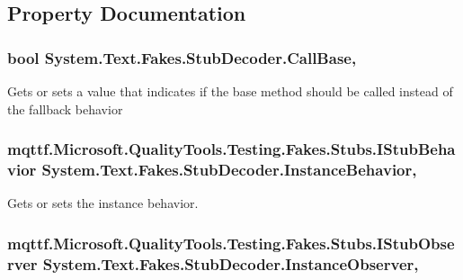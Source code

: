 \subsection{Property Documentation}
\hypertarget{class_system_1_1_text_1_1_fakes_1_1_stub_decoder_ada9819b95570b03be7d8bf4b170f2d0b}{
\subsubsection[{Call\-Base}]{\setlength{\rightskip}{0pt plus 5cm}bool System.\-Text.\-Fakes.\-Stub\-Decoder.\-Call\-Base\hspace{0.3cm}{\ttfamily [get]}, {\ttfamily [set]}}}\label{class_system_1_1_text_1_1_fakes_1_1_stub_decoder_ada9819b95570b03be7d8bf4b170f2d0b}


Gets or sets a value that indicates if the base method should be called instead of the fallback behavior

\hypertarget{class_system_1_1_text_1_1_fakes_1_1_stub_decoder_a5498bd2d3a406ace6a57c806fdec7264}{
\subsubsection[{Instance\-Behavior}]{\setlength{\rightskip}{0pt plus 5cm}mqttf.\-Microsoft.\-Quality\-Tools.\-Testing.\-Fakes.\-Stubs.\-I\-Stub\-Behavior System.\-Text.\-Fakes.\-Stub\-Decoder.\-Instance\-Behavior\hspace{0.3cm}{\ttfamily [get]}, {\ttfamily [set]}}}\label{class_system_1_1_text_1_1_fakes_1_1_stub_decoder_a5498bd2d3a406ace6a57c806fdec7264}


Gets or sets the instance behavior.

\hypertarget{class_system_1_1_text_1_1_fakes_1_1_stub_decoder_a8b70e6c0bca04b411ce970ef7aed028d}{
\subsubsection[{Instance\-Observer}]{\setlength{\rightskip}{0pt plus 5cm}mqttf.\-Microsoft.\-Quality\-Tools.\-Testing.\-Fakes.\-Stubs.\-I\-Stub\-Observer System.\-Text.\-Fakes.\-Stub\-Decoder.\-Instance\-Observer\hspace{0.3cm}{\ttfamily [get]}, {\ttfamily [set]}}}\label{class_system_1_1_text_1_1_fakes_1_1_stub_decoder_a8b70e6c0bca04b411ce970ef7aed028d}


